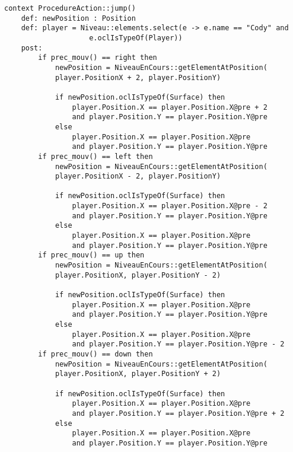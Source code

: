 \begin{lstlisting}[caption=Contract OCL psur le saut,captionpos=b,label={lst:action_jump},language=OCL]
context ProcedureAction::jump()
	def: newPosition : Position
	def: player = Niveau::elements.select(e -> e.name == "Cody" and
					e.oclIsTypeOf(Player))
	post:
		if prec_mouv() == right then
			newPosition = NiveauEnCours::getElementAtPosition(
			player.PositionX + 2, player.PositionY)
			
			if newPosition.oclIsTypeOf(Surface) then
				player.Position.X == player.Position.X@pre + 2 
				and player.Position.Y == player.Position.Y@pre
			else
				player.Position.X == player.Position.X@pre 
				and player.Position.Y == player.Position.Y@pre
		if prec_mouv() == left then
			newPosition = NiveauEnCours::getElementAtPosition(
			player.PositionX - 2, player.PositionY)
			
			if newPosition.oclIsTypeOf(Surface) then
				player.Position.X == player.Position.X@pre - 2 
				and player.Position.Y == player.Position.Y@pre
			else		
				player.Position.X == player.Position.X@pre 
				and player.Position.Y == player.Position.Y@pre
		if prec_mouv() == up then
			newPosition = NiveauEnCours::getElementAtPosition(
			player.PositionX, player.PositionY - 2)
			
			if newPosition.oclIsTypeOf(Surface) then
				player.Position.X == player.Position.X@pre
				and player.Position.Y == player.Position.Y@pre
			else
				player.Position.X == player.Position.X@pre 
				and player.Position.Y == player.Position.Y@pre - 2
		if prec_mouv() == down then
			newPosition = NiveauEnCours::getElementAtPosition(
			player.PositionX, player.PositionY + 2)
			
			if newPosition.oclIsTypeOf(Surface) then
				player.Position.X == player.Position.X@pre 
				and player.Position.Y == player.Position.Y@pre + 2
			else
				player.Position.X == player.Position.X@pre 
				and player.Position.Y == player.Position.Y@pre
\end{lstlisting}